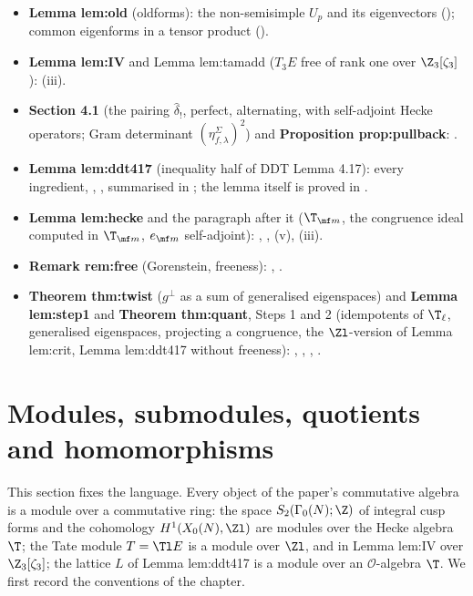 \begin{itemize}
\item \textbf{Lemma lem:old} (oldforms): the non-semisimple $U_p$ and its eigenvectors (); common eigenforms in a tensor product
().
\item \textbf{Lemma lem:IV} and Lemma lem:tamadd ($T_3E$ free of rank one over $\Z_3[\zeta_3]$): (iii).
\item \textbf{Section 4.1} (the pairing $\hat\delta_!$, perfect, alternating, with self-adjoint Hecke operators; Gram determinant $(\eta^\Sigma_{f,\lambda})^2$) and \textbf{Proposition
prop:pullback}: .
\item \textbf{Lemma lem:ddt417} (inequality half of DDT Lemma 4.17): every ingredient, ,
, summarised in ; the lemma itself is proved in .
\item \textbf{Lemma lem:hecke} and the paragraph after it ($\T_{\mf m}$, the congruence ideal computed in $\T_{\mf m}$, $e_{\mf m}$ self-adjoint): ,
, (v), (iii).
\item \textbf{Remark rem:free} (Gorenstein, freeness): , .
\item \textbf{Theorem thm:twist} ($g^\perp$ as a sum of generalised eigenspaces) and \textbf{Lemma lem:step1} and \textbf{Theorem thm:quant}, Steps 1 and 2 (idempotents of $\T_\ell$, generalised
eigenspaces, projecting a congruence, the $\Zl$-version of Lemma lem:crit, Lemma lem:ddt417 without freeness): ,
, , .
\end{itemize}

\section{Modules, submodules, quotients and homomorphisms}\label{sec:modules:modules}

This section fixes the language. Every object of the paper's commutative algebra is a module over a commutative
ring: the space $S_2(\Gamma_0(N);\Z)$ of integral cusp forms and the cohomology $H^1(X_0(N),\Zl)$ are modules over the
Hecke algebra $\T$; the Tate module $T=\Tl E$ is a module over $\Zl$, and in Lemma lem:IV over $\Z_3[\zeta_3]$; the
lattice $L$ of Lemma lem:ddt417 is a module over an $\mathcal O$-algebra $\T$. We first record the conventions of the chapter.

